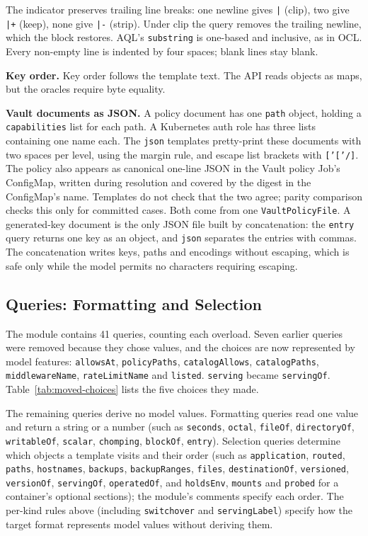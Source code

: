 The indicator preserves trailing line breaks: one newline gives \texttt{|}
(clip), two give \texttt{|+} (keep), none give \texttt{|-} (strip). Under clip the query
removes the trailing newline, which the block restores. AQL's \texttt{substring} is one-based
and inclusive, as in OCL. Every non-empty line is indented by four spaces; blank lines stay blank.

\textbf{Key order.} Key order follows the template text. The API reads
objects as maps, but the oracles require byte equality.

\textbf{Vault documents as JSON.} A policy document has one \texttt{path}
object, holding a \texttt{capabilities} list for each path. A Kubernetes auth role
has three lists containing one name each. The \texttt{json} templates pretty-print
these documents with two spaces per level, using the margin rule, and escape list brackets
with \texttt{['['/]}. The policy also appears as canonical one-line JSON
in the Vault policy Job's ConfigMap, written during resolution and covered
by the digest in the ConfigMap's name. Templates do not check that the two agree;
parity comparison checks this only for committed cases. Both come from one \texttt{VaultPolicyFile}.
A generated-key document is the only JSON file built by concatenation: the \texttt{entry}
query returns one key as an object, and \texttt{json} separates the entries with
commas. The concatenation writes keys, paths and encodings without escaping, which is
safe only while the model permits no characters requiring escaping.

\subsection{Queries: Formatting and Selection}
\label{sec:m2t-queries}

The module contains 41 queries, counting each overload. Seven earlier
queries were removed because they chose values, and the
choices are now represented by model features: \texttt{allowsAt}, \texttt{policyPaths},
\texttt{catalogAllows}, \texttt{catalogPaths}, \texttt{middlewareName},
\texttt{rateLimitName} and \texttt{listed}. \texttt{serving} became \texttt{servingOf}.
Table~\ref{tab:moved-choices} lists the five choices they made.

The remaining queries derive no model values. Formatting queries read one value and return a string or a number (such as \texttt{seconds}, \texttt{octal},
\texttt{fileOf}, \texttt{directoryOf}, \texttt{writableOf}, \texttt{scalar},
\texttt{chomping}, \texttt{blockOf}, \texttt{entry}). Selection queries determine which objects a template visits and their order (such as \texttt{application},
\texttt{routed}, \texttt{paths}, \texttt{hostnames}, \texttt{backups},
\texttt{backupRanges}, \texttt{files}, \texttt{destinationOf}, \texttt{versioned},
\texttt{versionOf}, \texttt{servingOf}, \texttt{operatedOf}, and \texttt{holdsEnv}, \texttt{mounts}
and \texttt{probed} for a container's optional sections); the module's comments specify each order.
The per-kind rules above (including \texttt{switchover} and \texttt{servingLabel})
specify how the target format represents model values without deriving them.

